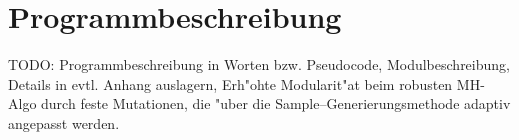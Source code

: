 	\chapter{Programmbeschreibung}\label{cha:program_description}
	TODO: Programmbeschreibung in Worten bzw. Pseudocode, Modulbeschreibung, Details in evtl. Anhang auslagern, Erh"ohte Modularit"at beim robusten MH-Algo durch feste Mutationen, die "uber die Sample--Generierungsmethode adaptiv angepasst werden.